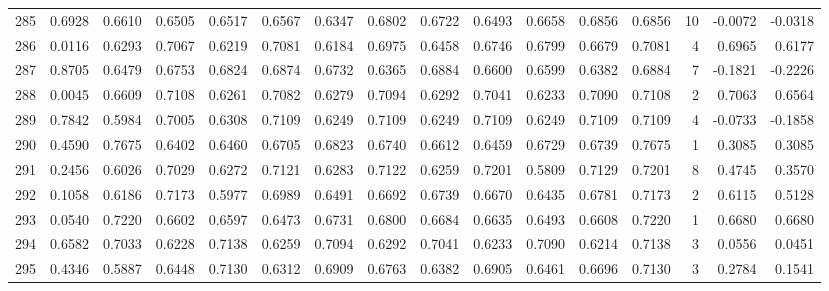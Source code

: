 \begin{tabular}{lrrrrrrrrrrrrrrr}
285 &      0.6928 &  0.6610 &  0.6505 &  0.6517 &  0.6567 &  0.6347 &  0.6802 &  0.6722 &  0.6493 &  0.6658 &   0.6856 &     0.6856 &     10 &                   -0.0072 &                    -0.0318 \\
286 &      0.0116 &  0.6293 &  0.7067 &  0.6219 &  0.7081 &  0.6184 &  0.6975 &  0.6458 &  0.6746 &  0.6799 &   0.6679 &     0.7081 &      4 &                    0.6965 &                     0.6177 \\
287 &      0.8705 &  0.6479 &  0.6753 &  0.6824 &  0.6874 &  0.6732 &  0.6365 &  0.6884 &  0.6600 &  0.6599 &   0.6382 &     0.6884 &      7 &                   -0.1821 &                    -0.2226 \\
288 &      0.0045 &  0.6609 &  0.7108 &  0.6261 &  0.7082 &  0.6279 &  0.7094 &  0.6292 &  0.7041 &  0.6233 &   0.7090 &     0.7108 &      2 &                    0.7063 &                     0.6564 \\
289 &      0.7842 &  0.5984 &  0.7005 &  0.6308 &  0.7109 &  0.6249 &  0.7109 &  0.6249 &  0.7109 &  0.6249 &   0.7109 &     0.7109 &      4 &                   -0.0733 &                    -0.1858 \\
290 &      0.4590 &  0.7675 &  0.6402 &  0.6460 &  0.6705 &  0.6823 &  0.6740 &  0.6612 &  0.6459 &  0.6729 &   0.6739 &     0.7675 &      1 &                    0.3085 &                     0.3085 \\
291 &      0.2456 &  0.6026 &  0.7029 &  0.6272 &  0.7121 &  0.6283 &  0.7122 &  0.6259 &  0.7201 &  0.5809 &   0.7129 &     0.7201 &      8 &                    0.4745 &                     0.3570 \\
292 &      0.1058 &  0.6186 &  0.7173 &  0.5977 &  0.6989 &  0.6491 &  0.6692 &  0.6739 &  0.6670 &  0.6435 &   0.6781 &     0.7173 &      2 &                    0.6115 &                     0.5128 \\
293 &      0.0540 &  0.7220 &  0.6602 &  0.6597 &  0.6473 &  0.6731 &  0.6800 &  0.6684 &  0.6635 &  0.6493 &   0.6608 &     0.7220 &      1 &                    0.6680 &                     0.6680 \\
294 &      0.6582 &  0.7033 &  0.6228 &  0.7138 &  0.6259 &  0.7094 &  0.6292 &  0.7041 &  0.6233 &  0.7090 &   0.6214 &     0.7138 &      3 &                    0.0556 &                     0.0451 \\
295 &      0.4346 &  0.5887 &  0.6448 &  0.7130 &  0.6312 &  0.6909 &  0.6763 &  0.6382 &  0.6905 &  0.6461 &   0.6696 &     0.7130 &      3 &                    0.2784 &                     0.1541 \\

\end{tabular}
